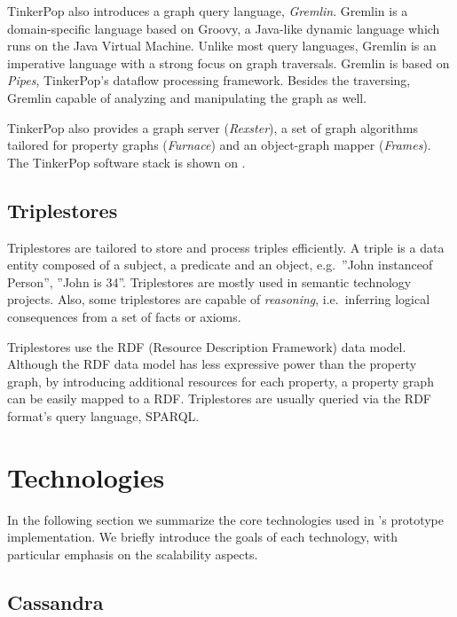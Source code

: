 
TinkerPop also introduces a graph query language, \textit{Gremlin}. Gremlin is a domain-specific language based on Groovy, a Java-like dynamic language which runs on the Java Virtual Machine. Unlike most query languages, Gremlin is an imperative language with a strong focus on graph traversals. Gremlin is based on \textit{Pipes}, TinkerPop's dataflow processing framework. Besides the traversing, Gremlin capable of analyzing and manipulating the graph as well.

TinkerPop also provides a graph server (\textit{Rexster}), a set of graph algorithms tailored for property graphs (\textit{Furnace}) and an object-graph mapper (\textit{Frames}). The TinkerPop software stack is shown on .


\subsection{Triplestores}

Triplestores are tailored to store and process triples efficiently. A triple is a data entity composed of a subject, a predicate and an object, e.g.\ ''John instanceof Person'', ''John is 34''. Triplestores are mostly used in semantic technology projects. Also, some triplestores are capable of \emph{reasoning}, i.e.\ inferring logical consequences from a set of facts or axioms. 

Triplestores use the RDF (Resource Description Framework) data model. Although the RDF data model has less expressive power than the property graph, by introducing additional resources for each property, a property graph can be easily mapped to a RDF. Triplestores are usually queried via the RDF format's query language, SPARQL. 

\section{Technologies}

In the following section we summarize the core technologies used in \iqd's prototype implementation. We briefly introduce the goals of each technology, with particular emphasis on the scalability aspects.

\subsection{Cassandra}

